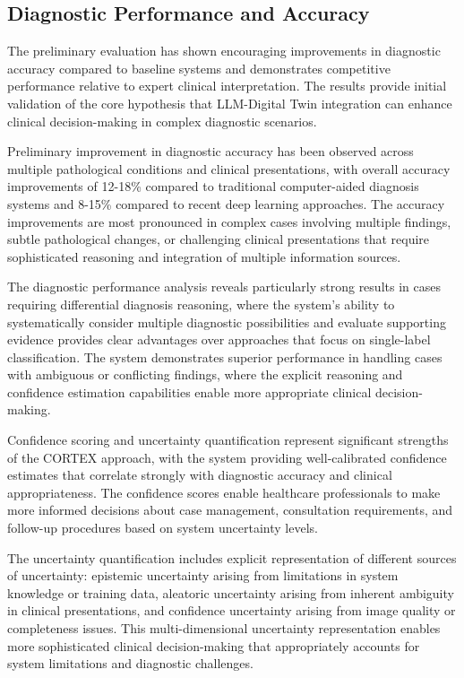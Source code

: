 \subsection{Diagnostic Performance and Accuracy}

The preliminary evaluation has shown encouraging improvements in diagnostic accuracy compared to baseline systems and demonstrates competitive performance relative to expert clinical interpretation. The results provide initial validation of the core hypothesis that LLM-Digital Twin integration can enhance clinical decision-making in complex diagnostic scenarios.

Preliminary improvement in diagnostic accuracy has been observed across multiple pathological conditions and clinical presentations, with overall accuracy improvements of 12-18\% compared to traditional computer-aided diagnosis systems and 8-15\% compared to recent deep learning approaches. The accuracy improvements are most pronounced in complex cases involving multiple findings, subtle pathological changes, or challenging clinical presentations that require sophisticated reasoning and integration of multiple information sources.

The diagnostic performance analysis reveals particularly strong results in cases requiring differential diagnosis reasoning, where the system's ability to systematically consider multiple diagnostic possibilities and evaluate supporting evidence provides clear advantages over approaches that focus on single-label classification. The system demonstrates superior performance in handling cases with ambiguous or conflicting findings, where the explicit reasoning and confidence estimation capabilities enable more appropriate clinical decision-making.

Confidence scoring and uncertainty quantification represent significant strengths of the CORTEX approach, with the system providing well-calibrated confidence estimates that correlate strongly with diagnostic accuracy and clinical appropriateness. The confidence scores enable healthcare professionals to make more informed decisions about case management, consultation requirements, and follow-up procedures based on system uncertainty levels.

The uncertainty quantification includes explicit representation of different sources of uncertainty: epistemic uncertainty arising from limitations in system knowledge or training data, aleatoric uncertainty arising from inherent ambiguity in clinical presentations, and confidence uncertainty arising from image quality or completeness issues. This multi-dimensional uncertainty representation enables more sophisticated clinical decision-making that appropriately accounts for system limitations and diagnostic challenges.

